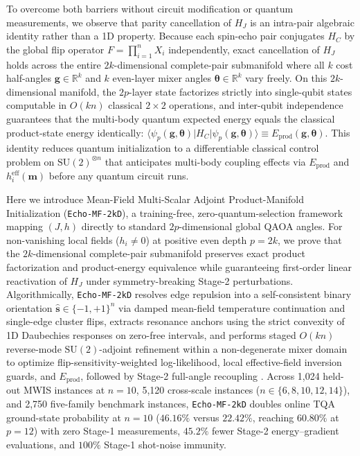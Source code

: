 \documentclass[10pt,a4paper]{article}
\begin{document}
To overcome both barriers without circuit modification or quantum measurements, we observe that parity cancellation of $H_J$ is an intra-pair algebraic identity rather than a 1D property. Because each spin-echo pair conjugates $H_C$ by the global flip operator $F = \prod_{i=1}^n X_i$ independently, exact cancellation of $H_J$ holds across the entire $2k$-dimensional complete-pair submanifold where all $k$ cost half-angles $\boldsymbol{g} \in \mathbb{R}^k$ and $k$ even-layer mixer angles $\boldsymbol{\theta} \in \mathbb{R}^k$ vary freely. On this $2k$-dimensional manifold, the $2p$-layer state factorizes strictly into single-qubit states computable in $O(kn)$ classical $2\times 2$ operations, and inter-qubit independence guarantees that the multi-body quantum expected energy equals the classical product-state energy identically: $\langle\psi_p(\boldsymbol{g},\boldsymbol{\theta})|H_C|\psi_p(\boldsymbol{g},\boldsymbol{\theta})\rangle \equiv E_{\mathrm{prod}}(\boldsymbol{g},\boldsymbol{\theta})$. This identity reduces quantum initialization to a differentiable classical control problem on $\mathrm{SU}(2)^{\otimes n}$ that anticipates multi-body coupling effects via $E_{\mathrm{prod}}$ and $h_i^{\mathrm{eff}}(\boldsymbol{m})$ before any quantum circuit runs.

Here we introduce Mean-Field Multi-Scalar Adjoint Product-Manifold Initialization (\texttt{Echo-MF-2kD}), a training-free, zero-quantum-selection framework mapping $(J, h)$ directly to standard $2p$-dimensional global QAOA angles. For non-vanishing local fields ($h_i \ne 0$) at positive even depth $p = 2k$, we prove that the $2k$-dimensional complete-pair submanifold preserves exact product factorization and product-energy equivalence while guaranteeing first-order linear reactivation of $H_J$ under symmetry-breaking Stage-2 perturbations. Algorithmically, \texttt{Echo-MF-2kD} resolves edge repulsion into a self-consistent binary orientation $\hat{\boldsymbol{s}} \in \{-1, +1\}^n$ via damped mean-field temperature continuation and single-edge cluster flips, extracts resonance anchors using the strict convexity of 1D Daubechies responses on zero-free intervals, and performs staged $O(kn)$ reverse-mode $\mathrm{SU}(2)$-adjoint refinement within a non-degenerate mixer domain to optimize flip-sensitivity-weighted log-likelihood, local effective-field inversion guards, and $E_{\mathrm{prod}}$, followed by Stage-2 full-angle recoupling \citep{dupont2022entanglement}. Across 1,024 held-out MWIS instances at $n=10$, 5,120 cross-scale instances ($n \in \{6, 8, 10, 12, 14\}$), and 2,750 five-family benchmark instances, \texttt{Echo-MF-2kD} doubles online TQA ground-state probability at $n=10$ ($46.16\%$ versus $22.42\%$, reaching $60.80\%$ at $p=12$) with zero Stage-1 measurements, $45.2\%$ fewer Stage-2 energy--gradient evaluations, and $100\%$ Stage-1 shot-noise immunity.
\end{document}
